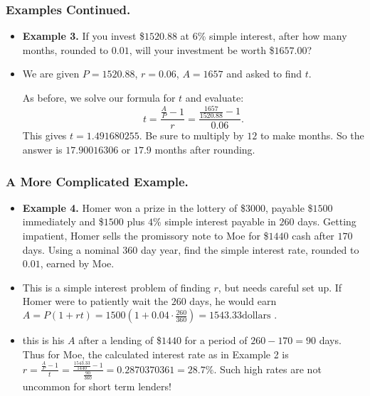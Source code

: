 \begin{frame}%
  \frametitle{Examples Continued.}
  \begin{itemize}%

\item {\bf Example 3.}
If you invest \$$1520.88$ at $6$\% simple interest,
after how many months, rounded to $0.01$, will your investment be
worth \$$1657.00$?
\item We are given $P=1520.88$, $r=0.06$, $A=1657$ and asked to find
$t$.

As before, we solve our formula for $t$ and evaluate:
$$t= \frac{\frac{A}{P}-1}{r} = \frac{\frac{1657}{1520.88}-1}{0.06}.$$
This gives $t=1.491680255$. Be sure to multiply by $12$ to make months.
So the answer is $17.90016306$ or $17.9$ months after rounding. 



\end{itemize}
\end{frame}

%



\begin{frame}%
  \frametitle{A More Complicated Example.}
  \begin{itemize}%
 
\item {\bf Example 4.}
Homer won a prize in the lottery of \$$3000$, payable \$$1500$
immediately and \$$1500$ plus $4$\% simple interest payable in $260$
days.
Getting impatient, Homer sells the promissory note to Moe for \$$1440$
cash after $170$ days. Using a nominal $360$ day year, find the
simple interest rate, rounded to $0.01$, earned by Moe.
\item
This is a simple interest problem of finding $r$, but needs careful set
up. If Homer were to patiently wait the $260$ days, he would earn
$A=P(1+rt) = 1500(1+0.04\cdot \frac{260}{360}) = 1543.33 \mbox{
dollars }.$

\item {} this is his $A$ after a lending of \$$1440$
for a period of $260-170 = 90$ days. Thus for Moe, the calculated
interest rate as in Example 2 is 
$r=\frac{\frac{A}{P}-1}{t} = \frac{\frac{1543.33}{1440}-1}{\frac{90}{360}}
= 0.2870370361 = 28.7\%.$
 Such high rates
are not uncommon for short term lenders!


\end{itemize}
\end{frame}

